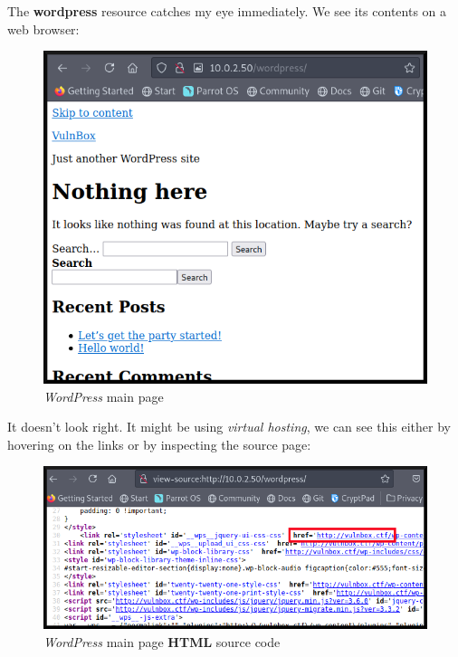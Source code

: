 \documentclass[12pt]{article}
\begin{document}
    The \textbf{wordpress} resource catches my eye immediately. We see its
    contents on a web browser:

    \begin{figure}[H]\label{pic:08-browser-wordpress}
        \centering
        \includegraphics[width=1.00\textwidth]{08-browser-wordpress.png}
        \caption{\textit{WordPress} main page}
    \end{figure}

    It doesn't look right. It might be using \textit{virtual hosting}, we can
    see this either by hovering on the links or by inspecting the source page:

    \begin{figure}[H]\label{pic:09-browser-src-wordpress}
        \centering
        \includegraphics[width=1.00\textwidth]{09-browser-src-wordpress.png}
        \caption{\textit{WordPress} main page \textbf{HTML} source code}
    \end{figure}
    
\end{document}
